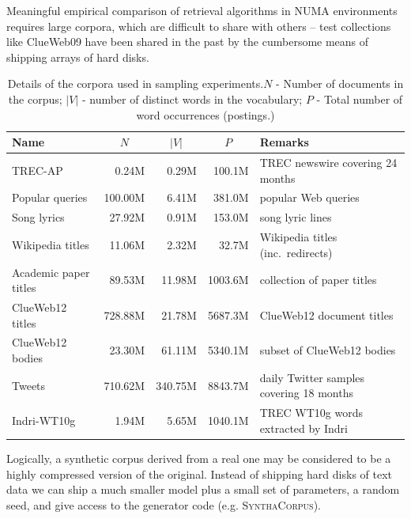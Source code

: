 \documentclass[11pt]{report}
\newcommand{\TRECAP}{TREC-AP}
\newcommand{\TopQ}{Popular queries}
\newcommand{\classificationPaper}{Song lyrics}
\newcommand{\Wikipedia}{Wikipedia titles}
\newcommand{\AcademicID}{Academic paper titles}
\newcommand{\clueWebTitles}{ClueWeb12 titles}
\newcommand{\clueWebBodiesLarge}{ClueWeb12 bodies}
\newcommand{\Tweets}{Tweets}
\newcommand{\IndriWT}{Indri-WT10g}
\begin{document}
Meaningful empirical comparison of retrieval algorithms in NUMA
environments requires large corpora, which are difficult to share with
others -- test collections like ClueWeb09 have been shared in the past
by the
cumbersome means of shipping arrays of hard disks.

\begin{table}[t] \tiny
\caption{Details of the corpora used in sampling
  experiments.\label{t:corpora}  $N$ - Number of documents in the
  corpus; $|V|$ - number of distinct words in the vocabulary; $P$ -
  Total number of word occurrences (postings.)
}
\begin{tabular}{lrrrl}%
Name                 & \multicolumn{1}{c}{$N$} & \multicolumn{1}{c}{$|V|$} & \multicolumn{1}{c}{$P$} & Remarks\\
\hline
\TRECAP              &   0.24M &   0.29M &  100.1M & TREC newswire covering 24 months\\
\TopQ                & 100.00M &   6.41M &  381.0M & popular Web queries\\
\classificationPaper &  27.92M &   0.91M &  153.0M & song lyric lines\\
\Wikipedia           &  11.06M &   2.32M &   32.7M & Wikipedia titles (inc.~redirects)\\
\AcademicID          &  89.53M &  11.98M & 1003.6M & collection of paper titles\\
\clueWebTitles       & 728.88M &  21.78M & 5687.3M & ClueWeb12 document titles\\
\clueWebBodiesLarge  &  23.30M &  61.11M & 5340.1M & subset of ClueWeb12 bodies\\
\Tweets              & 710.62M & 340.75M & 8843.7M & daily Twitter samples covering 18 months\\
\IndriWT             &   1.94M &   5.65M & 1040.1M & TREC WT10g words extracted by Indri\\
\hline
\end{tabular}
\end{table}

Logically, a synthetic corpus derived from a real one may be
considered to be a highly compressed version of the original.  Instead
of shipping hard disks of text data we can ship a much smaller
model plus a small set of parameters, a random seed, and give access
to the generator code (e.g. \textsc{SynthaCorpus}).
\end{document}
